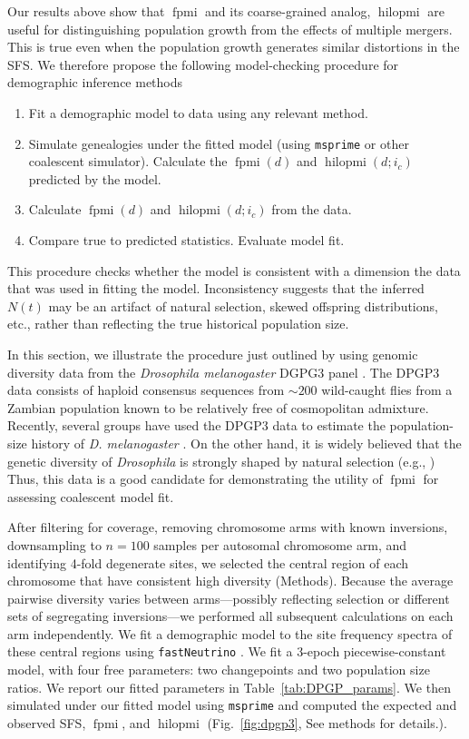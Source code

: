 \documentclass[11pt, letterpaper]{article}   	%
\newcommand{\fig}[1]{Fig.~\ref{#1}}
\DeclareMathOperator{\fpmi}{fpmi}
\DeclareMathOperator{\hilopmi}{hilopmi}
\begin{document}
Our results above show that $\fpmi$ and its coarse-grained analog, $\hilopmi$ are useful for distinguishing population growth from the effects of multiple mergers.
This is true even when the population growth generates similar distortions in the SFS.
We therefore propose the following model-checking procedure for demographic inference methods
\begin{enumerate}[label=(\roman*), before=\unskip{: }]
    \item Fit a demographic model to data using any relevant method.
    \item Simulate genealogies under the fitted model (using \texttt{msprime} or other coalescent simulator). Calculate the $\fpmi(d)$ and $\hilopmi(d;i_c)$ predicted by the model.
    \item Calculate $\fpmi(d)$ and $\hilopmi(d;i_c)$ from the data.
    \item Compare true to predicted statistics. Evaluate model fit.
\end{enumerate}
This procedure checks whether the model is consistent with a dimension the data that was used in fitting the model.
Inconsistency suggests that the inferred $N(t)$ may be an artifact of natural selection, skewed offspring distributions, etc., rather than reflecting the true historical population size.

In this section, we illustrate the procedure just outlined by using genomic diversity data from the \textit{Drosophila melanogaster} DGPG3 panel \cite{LackEtAl2015}.
The DPGP3 data consists of haploid consensus sequences from $\sim 200$ wild-caught flies from a Zambian population known to be relatively free of cosmopolitan admixture.
Recently, several groups have used the DPGP3 data to estimate the population-size history of \textit{D. melanogaster} \autocite{TerhorstEtAl2017,RagsdaleGutenkunst2017}.
On the other hand, it is widely believed that the genetic diversity of \textit{Drosophila} is strongly shaped by natural selection (e.g., \cite{Elyashiv??201?, GarudPetrov2016, others?})
Thus, this data is a good candidate for demonstrating the utility of $\fpmi$ for assessing coalescent model fit.

After filtering for coverage, removing chromosome arms with known inversions, downsampling to $n=100$ samples per autosomal chromosome arm, and identifying 4-fold degenerate sites, we selected the central region of each chromosome that have consistent high diversity (Methods).
Because the average pairwise diversity varies between arms---possibly reflecting selection or different sets of segregating inversions---we performed all subsequent calculations on each arm independently.
We fit a demographic model to the site frequency spectra of these central regions using \texttt{fastNeutrino} \cite{BhaskarEtal2015}.
We fit a 3-epoch piecewise-constant model, with four free parameters: two changepoints and two population size ratios.
We report our fitted parameters in Table~\ref{tab:DPGP_params}.
We then simulated under our fitted model using \texttt{msprime} and computed the expected and observed SFS, $\fpmi$, and $\hilopmi$ (\fig{fig:dpgp3}, See methods for details.).
\end{document}
